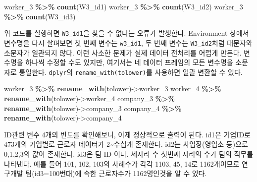 \documentclass[
]{book}
\newenvironment{Shaded}{\begin{snugshade}}{\end{snugshade}}
\newcommand{\FunctionTok}[1]{\textcolor[rgb]{0.13,0.29,0.53}{\textbf{#1}}}
\newcommand{\NormalTok}[1]{#1}
\newcommand{\OtherTok}[1]{\textcolor[rgb]{0.56,0.35,0.01}{#1}}
\newcommand{\SpecialCharTok}[1]{\textcolor[rgb]{0.81,0.36,0.00}{\textbf{#1}}}
\begin{document}
\begin{Shaded}
\begin{Highlighting}[]
\NormalTok{worker\_3 }\SpecialCharTok{\%\textgreater{}\%} 
  \FunctionTok{count}\NormalTok{(W3\_id1)}
\NormalTok{worker\_3 }\SpecialCharTok{\%\textgreater{}\%} 
  \FunctionTok{count}\NormalTok{(W3\_id2)}
\NormalTok{worker\_3 }\SpecialCharTok{\%\textgreater{}\%} 
  \FunctionTok{count}\NormalTok{(W3\_id3)}
\end{Highlighting}
\end{Shaded}

위 코드를 실행하면 \texttt{W3\_id1}을 찾을 수 없다는 오류가 발생한다. Environment 창에서 변수명을 다시 살펴보면 첫 번째 변수는 \texttt{w3\_id1}, 두 번째 변수는 \texttt{W3\_id2}처럼 대문자와 소문자가 일관되지 않다. 이런 사소한 문제가 실제 데이터 전처리를 어렵게 만든다. 변수명을 하나씩 수정할 수도 있지만, 여기서는 네 데이터 프레임의 모든 변수명을 소문자로 통일한다. \texttt{dplyr}의 \texttt{rename\_with(tolower)}를 사용하면 일괄 변환할 수 있다.

\begin{Shaded}
\begin{Highlighting}[]
\NormalTok{worker\_3 }\SpecialCharTok{\%\textgreater{}\%} 
  \FunctionTok{rename\_with}\NormalTok{(tolower)}\OtherTok{{-}\textgreater{}}\NormalTok{worker\_3}
\NormalTok{worker\_4 }\SpecialCharTok{\%\textgreater{}\%} 
  \FunctionTok{rename\_with}\NormalTok{(tolower)}\OtherTok{{-}\textgreater{}}\NormalTok{worker\_4}
\NormalTok{company\_3 }\SpecialCharTok{\%\textgreater{}\%} 
  \FunctionTok{rename\_with}\NormalTok{(tolower)}\OtherTok{{-}\textgreater{}}\NormalTok{company\_3}
\NormalTok{company\_4 }\SpecialCharTok{\%\textgreater{}\%} 
  \FunctionTok{rename\_with}\NormalTok{(tolower)}\OtherTok{{-}\textgreater{}}\NormalTok{company\_4}
\end{Highlighting}
\end{Shaded}

ID관련 변수 4개의 빈도를 확인해보니, 이제 정상적으로 출력이 된다. id1은 기업ID로 473개의 기업별로 근로자 데이터가 2\textasciitilde 수십개 존재한다. id2는 사업장(영업소 등)으로 0,1,2,3의 값이 존재한다. id3은 팀 ID 이다. 세자리 수 첫번째 자리의 수가 팀의 직무를 나타낸다. 예를 들어 101, 102, 103의 사례수가 각각 1103, 45, 14로 1162개이므로 연구개발 팀(id3=100번대)에 속한 근로자수가 1162명인것을 알 수 있다.
\end{document}
